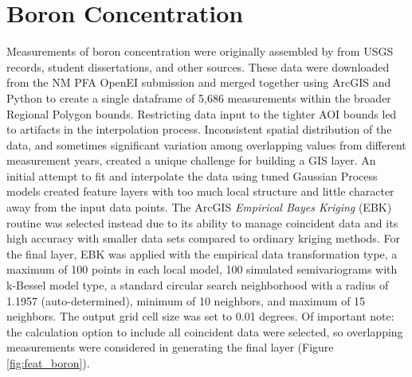 \section{Boron Concentration}\label{app:dl_boron}
Measurements of boron concentration were originally assembled by \citet{bielicki_hydrogeolgic_2015} from USGS records, student dissertations, and other sources. These data were downloaded from the NM PFA OpenEI submission \citep{kelley_geothermal_2015} and merged together using ArcGIS and Python to create a single dataframe of 5,686 measurements within the broader Regional Polygon bounds. Restricting data input to the tighter AOI bounds led to artifacts in the interpolation process. Inconsistent spatial distribution of the data, and sometimes significant variation among overlapping values from different measurement years, created a unique challenge for building a GIS layer. An initial attempt to fit and interpolate the data using tuned Gaussian Process models created feature layers with too much local structure and little character away from the input data points. The ArcGIS \textit{Empirical Bayes Kriging} (EBK) routine was selected instead due to its ability to manage coincident data and its high accuracy with smaller data sets compared to ordinary kriging methods. For the final layer, EBK was applied with the empirical data transformation type, a maximum of 100 points in each local model, 100 simulated semivariograms with k-Bessel model type, a standard circular search neighborhood with a radius of 1.1957 (auto-determined), minimum of 10 neighbors, and maximum of 15 neighbors. The output grid cell size was set to 0.01 degrees. Of important note: the calculation option to include all coincident data were selected, so overlapping measurements were considered in generating the final layer (Figure \ref{fig:feat_boron}).
\vfill
\pagebreak

